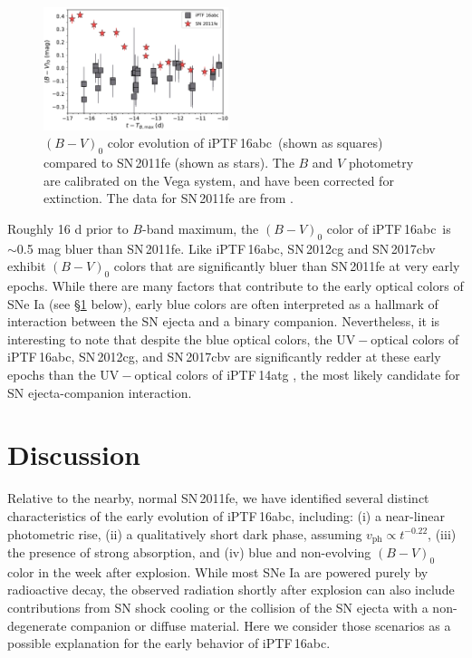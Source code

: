 \documentclass[twocolumn]{aastex61}
\newcommand{\abc}{iPTF\,16abc}
\begin{document}
\begin{figure}[]
  \centering
  \includegraphics[width=0.48\textwidth]{16abc_11fe_colors.pdf}
  \caption{$(B - V)_0$ color evolution of \abc\ (shown as squares) 
    compared to SN\,2011fe (shown as stars). The $B$ and $V$ 
    photometry are calibrated on the Vega system, and have been 
    corrected for extinction. The data for 
    SN\,2011fe are from \citet{2016ApJ...820...67Z}.}
  \label{fig:B-Vcolors}
\end{figure}

Roughly 16 d prior to $B$-band maximum, the $(B - V)_0$ color of \abc\ is $\sim$0.5 mag bluer than SN\,2011fe. Like \abc, SN\,2012cg \citep{2016ApJ...820...92M} and SN\,2017cbv \citep{2017arXiv170608990H} exhibit $(B - V)_0$ colors that are significantly bluer than SN\,2011fe at very early epochs. While there are many factors that contribute to the early optical colors of SNe Ia (see \S\ref{sec:lc_energy} below), early blue colors are often interpreted as a hallmark of interaction between the SN ejecta and a binary companion. Nevertheless, it is interesting to note that despite the blue optical colors, the $\mathrm{UV} - \mathrm{optical}$ colors of \abc, SN\,2012cg, and SN\,2017cbv are significantly redder at these early epochs than the $\mathrm{UV} - \mathrm{optical}$ colors of iPTF\,14atg \citep{2015Natur.521..328C}, the most likely candidate for SN ejecta-companion interaction. 

\section{Discussion}
\label{sec:lc_energy}

Relative to the nearby, normal SN\,2011fe, we have identified several distinct characteristics of the early evolution of \abc, including: (i) a near-linear photometric rise, (ii) a qualitatively short dark phase, assuming $v_\mathrm{ph} \propto t^{-0.22}$, (iii) the presence of strong  absorption, and (iv) blue and non-evolving $(B - V)_0$ color in the week after explosion. While most SNe Ia are powered purely by radioactive decay, the observed radiation shortly after explosion can also include contributions 
from SN shock cooling or the collision of the SN ejecta with a non-degenerate companion or diffuse material. Here we consider those scenarios as a possible explanation for the early behavior of \abc. 
\end{document}
